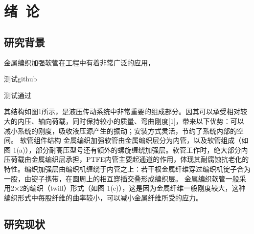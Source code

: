 


\chapter{绪~论}
\label{chap:introduintroduction}
\section{研究背景}
金属编织加强软管在工程中有着非常广泛的应用，

测试github

测试通过



其结构如图1所示，是液压传动系统中非常重要的组成部分。因其可以承受相对较大的内压、轴向荷载，同时保持较小的质量、弯曲刚度[1]，带来以下优势：可以减小系统的刚度，吸收液压源产生的振动；安装方式灵活，节约了系统内部的空间。
软管组件结构
金属编织加强软管由金属编织层分为内管，以及软管组成（如图 1(a)），部分耐高压型号还有额外的螺旋缠绕加强层。软管工作时，绝大部分内压荷载由金属编织层承担，PTFE内管主要起通道的作用，体现其耐腐蚀抗老化的特性。编织加强层由编织机缠绕于内管之上：若干根金属纤维穿过编织机锭子合为一股，由锭子携带，在圆周上的相互穿插交叠形成编织层。
金属编织软管一般采用2×2的编织（twill）形式（如图 1(c)），这是因为金属纤维一般刚度较大，这种编织形式中每股纤维的曲率较小，可以减小金属纤维所受的应力。

 	 	 
					
\section{研究现状}



